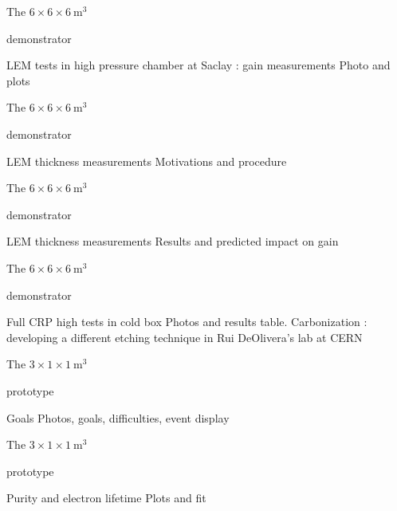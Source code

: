 \documentclass[10pt]{beamer}
\begin{document}
    \begin{frame}{The \texorpdfstring{$6 \times 6 \times \SI{6}{\meter\cubed}$}{666}
    		\begin{scriptsize}
    		\end{scriptsize} demonstrator}{LEM tests in high pressure chamber at Saclay : gain measurements}
    	Photo and plots
    \end{frame}
    
    \begin{frame}{The \texorpdfstring{$6 \times 6 \times \SI{6}{\meter\cubed}$}{666}
    		\begin{scriptsize}
    		\end{scriptsize} demonstrator}{LEM thickness measurements}
    	Motivations and procedure
    \end{frame}
    
    \begin{frame}{The \texorpdfstring{$6 \times 6 \times \SI{6}{\meter\cubed}$}{666}
    		\begin{scriptsize}
    		\end{scriptsize} demonstrator}{LEM thickness measurements}
    	Results and predicted impact on gain
    \end{frame}
    
    \begin{frame}{The \texorpdfstring{$6 \times 6 \times \SI{6}{\meter\cubed}$}{666}
    		\begin{scriptsize}
    		\end{scriptsize} demonstrator}{Full CRP high tests in cold box}
    	Photos and results table. Carbonization : developing a different etching technique in Rui DeOlivera's lab at CERN
    \end{frame}
    
    \begin{frame}{The \texorpdfstring{$3 \times 1 \times \SI{1}{\meter\cubed}$}{311}
    		\begin{scriptsize}
    		\end{scriptsize} prototype}{Goals}
    	Photos, goals, difficulties, event display
    \end{frame}
    
    \begin{frame}{The \texorpdfstring{$3 \times 1 \times \SI{1}{\meter\cubed}$}{311}
    		\begin{scriptsize}
    		\end{scriptsize} prototype}{Purity and electron lifetime}
    	Plots and fit
    \end{frame}
    
\end{document}
